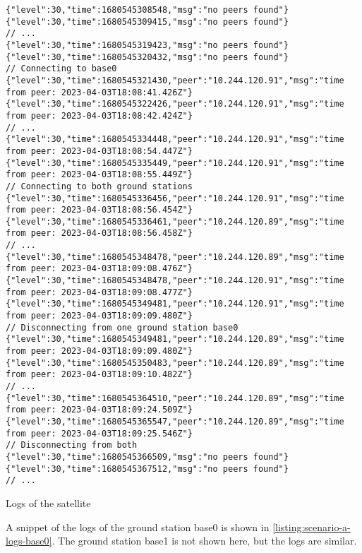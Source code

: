 \begin{listing}[H]
  \begin{verbatim}
{"level":30,"time":1680545308548,"msg":"no peers found"}
{"level":30,"time":1680545309415,"msg":"no peers found"}
// ...
{"level":30,"time":1680545319423,"msg":"no peers found"}
{"level":30,"time":1680545320432,"msg":"no peers found"}
// Connecting to base0
{"level":30,"time":1680545321430,"peer":"10.244.120.91","msg":"time from peer: 2023-04-03T18:08:41.426Z"}
{"level":30,"time":1680545322426,"peer":"10.244.120.91","msg":"time from peer: 2023-04-03T18:08:42.424Z"}
// ...
{"level":30,"time":1680545334448,"peer":"10.244.120.91","msg":"time from peer: 2023-04-03T18:08:54.447Z"}
{"level":30,"time":1680545335449,"peer":"10.244.120.91","msg":"time from peer: 2023-04-03T18:08:55.449Z"}
// Connecting to both ground stations
{"level":30,"time":1680545336456,"peer":"10.244.120.91","msg":"time from peer: 2023-04-03T18:08:56.454Z"}
{"level":30,"time":1680545336461,"peer":"10.244.120.89","msg":"time from peer: 2023-04-03T18:08:56.458Z"}
// ...
{"level":30,"time":1680545348478,"peer":"10.244.120.89","msg":"time from peer: 2023-04-03T18:09:08.476Z"}
{"level":30,"time":1680545348478,"peer":"10.244.120.91","msg":"time from peer: 2023-04-03T18:09:08.477Z"}
{"level":30,"time":1680545349481,"peer":"10.244.120.91","msg":"time from peer: 2023-04-03T18:09:09.480Z"}
// Disconnecting from one ground station base0
{"level":30,"time":1680545349481,"peer":"10.244.120.89","msg":"time from peer: 2023-04-03T18:09:09.480Z"}
{"level":30,"time":1680545350483,"peer":"10.244.120.89","msg":"time from peer: 2023-04-03T18:09:10.482Z"}
// ...
{"level":30,"time":1680545364510,"peer":"10.244.120.89","msg":"time from peer: 2023-04-03T18:09:24.509Z"}
{"level":30,"time":1680545365547,"peer":"10.244.120.89","msg":"time from peer: 2023-04-03T18:09:25.546Z"}
// Disconnecting from both
{"level":30,"time":1680545366509,"msg":"no peers found"}
{"level":30,"time":1680545367512,"msg":"no peers found"}
// ...
\end{verbatim}
  \caption{Logs of the satellite}
  \label{listing:scenario-a-logs-sat}
\end{listing}

A snippet of the logs of the ground station base0 is shown in \ref{listing:scenario-a-logs-base0}.
The ground station base1 is not shown here, but the logs are similar.

